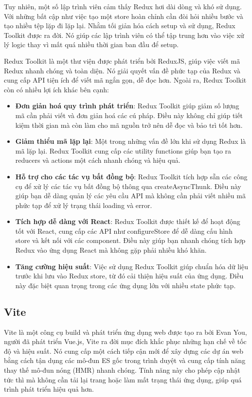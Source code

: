 Tuy nhiên, một số lập trình viên cảm thấy Redux hơi dài dòng và khó sử dụng. Với những bất cập như việc tạo một store hoàn chỉnh cần đòi hỏi nhiều bước và tạo nhiều tệp lặp đi lặp lại. Nhằm tối giản hóa cách setup và sử dụng, Redux Toolkit được ra đời. Nó giúp các lập trình viên có thể tập trung hơn vào việc xử lý logic thay vì mất quá nhiều thời gian ban đầu để setup.

Redux Toolkit là một thư viện được phát triển bởi ReduxJS, giúp việc viết mã Redux nhanh chóng và toàn diện. Nó giải quyết vấn đề phức tạp của Redux và cung cấp API tiện ích để viết mã ngắn gọn, dễ đọc hơn. Ngoài ra, Redux Toolkit còn có nhiều lợi ích khác bên cạnh:

\begin{itemize}
    \item \textbf{Đơn giản hoá quy trình phát triển}: Redux Toolkit giúp giảm số lượng mã cần phải viết và đơn giản hoá các cú pháp. Điều này không chỉ giúp tiết kiệm thời gian mà còn làm cho mã nguồn trở nên dễ đọc và bảo trì tốt hơn.
    \item \textbf{Giảm thiểu mã lặp lại}: Một trong những vấn đề lớn khi sử dụng Redux là mã lặp lại. Redux Toolkit cung cấp các utility functions giúp bạn tạo ra reducers và actions một cách nhanh chóng và hiệu quả.
    \item \textbf{Hỗ trợ cho các tác vụ bất đồng bộ}: Redux Toolkit tích hợp sẵn các công cụ để xử lý các tác vụ bất đồng bộ thông qua createAsyncThunk. Điều này giúp bạn dễ dàng quản lý các yêu cầu API mà không cần phải viết nhiều mã phức tạp để xử lý trạng thái loading và error.
    \item \textbf{Tích hợp dễ dàng với React}: Redux Toolkit được thiết kế để hoạt động tốt với React, cung cấp các API như configureStore để dễ dàng cấu hình store và kết nối với các component. Điều này giúp bạn nhanh chóng tích hợp Redux vào ứng dụng React mà không gặp phải nhiều khó khăn.
    \item \textbf{Tăng cường hiệu suất}: Việc sử dụng Redux Toolkit giúp chuẩn hóa dữ liệu trước khi lưu vào Redux store, từ đó cải thiện hiệu suất của ứng dụng. Điều này đặc biệt quan trọng trong các ứng dụng lớn với nhiều state phức tạp.
\end{itemize}

\subsection{Vite}
Vite là một công cụ build và phát triển ứng dụng web được tạo ra bởi Evan You, người đã phát triển Vue.js, Vite ra đời mục đích khắc phục những hạn chế về tốc độ và hiệu suất. Nó cung cấp một cách tiếp cận mới để xây dựng các dự án web bằng cách tận dụng các mô-đun ES gốc trong trình duyệt và cung cấp tính năng thay thế mô-đun nóng (HMR) nhanh chóng. Tính năng này cho phép cập nhật tức thì mà không cần tải lại trang hoặc làm mất trạng thái ứng dụng, giúp quá trình phát triển hiệu quả hơn.


